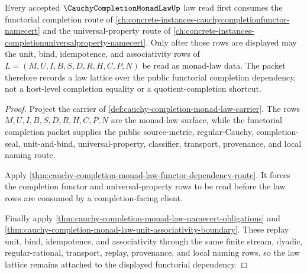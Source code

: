 \begin{lemma}
\label{lem:cauchy-completion-monad-law-functorial-law-lattice-route}
Every accepted $\CauchyCompletionMonadLawUp$ law read first consumes the functorial completion route of \autoref{ch:concrete-instances-cauchycompletionfunctor-namecert} and the universal-property route of \autoref{ch:concrete-instances-completionuniversalproperty-namecert}. Only after those rows are displayed may the unit, bind, idempotence, and associativity rows of $L=(M,U,I,B,S,D,R,H,C,P,N)$ be read as monad-law data. The packet therefore records a law lattice over the public functorial completion dependency, not a host-level completion equality or a quotient-completion shortcut.
\end{lemma}
\begin{proof}
Project the carrier of \autoref{def:cauchy-completion-monad-law-carrier}. The rows $M,U,I,B,S,D,R,H,C,P,N$ are the monad-law surface, while the functorial completion packet supplies the public source-metric, regular-Cauchy, completion-seal, unit-and-bind, universal-property, classifier, transport, provenance, and local naming route.

Apply \autoref{thm:cauchy-completion-monad-law-functor-dependency-route}. It forces the completion functor and universal-property rows to be read before the law rows are consumed by a completion-facing client.

Finally apply \autoref{thm:cauchy-completion-monad-law-namecert-obligations} and \autoref{thm:cauchy-completion-monad-law-unit-associativity-boundary}. These replay unit, bind, idempotence, and associativity through the same finite stream, dyadic, regular-rational, transport, replay, provenance, and local naming rows, so the law lattice remains attached to the displayed functorial dependency.
\end{proof}
